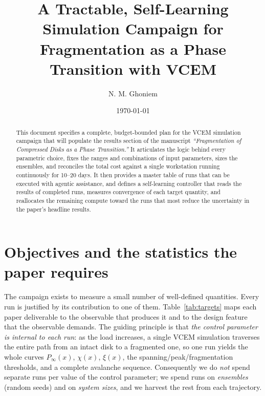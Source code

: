 \documentclass[11pt]{article}
\title{\textbf{A Tractable, Self-Learning Simulation Campaign for\\
Fragmentation as a Phase Transition with VCEM}}
\author{N. M. Ghoniem}
\date{\today}
\newcommand{\Pinf}{P_\infty}
\begin{document}
\maketitle

\begin{abstract}
This document specifies a complete, budget-bounded plan for the VCEM simulation
campaign that will populate the results section of the manuscript
\emph{``Fragmentation of Compressed Disks as a Phase Transition.''} It articulates the
logic behind every parametric choice, fixes the ranges and combinations of input
parameters, sizes the ensembles, and reconciles the total cost against a single
workstation running continuously for 10--20 days. It then provides a master table of
runs that can be executed with agentic assistance, and defines a self-learning
controller that reads the results of completed runs, measures convergence of each
target quantity, and reallocates the remaining compute toward the runs that most
reduce the uncertainty in the paper's headline results.
\end{abstract}

\tableofcontents

\section{Objectives and the statistics the paper requires}
\label{sec:objectives}

The campaign exists to measure a small number of well-defined quantities. Every run
is justified by its contribution to one of them. Table~\ref{tab:targets} maps each
paper deliverable to the observable that produces it and to the design feature that
the observable demands. The guiding principle is that \emph{the control parameter is
internal to each run}: as the load increases, a single VCEM simulation traverses the
entire path from an intact disk to a fragmented one, so one run yields the whole
curves $\Pinf(x)$, $\chi(x)$, $\xi(x)$, the spanning/peak/fragmentation thresholds,
and a complete avalanche sequence. Consequently we do \emph{not} spend separate runs
per value of the control parameter; we spend runs on \emph{ensembles} (random seeds)
and on \emph{system sizes}, and we harvest the rest from each trajectory.
\end{document}
